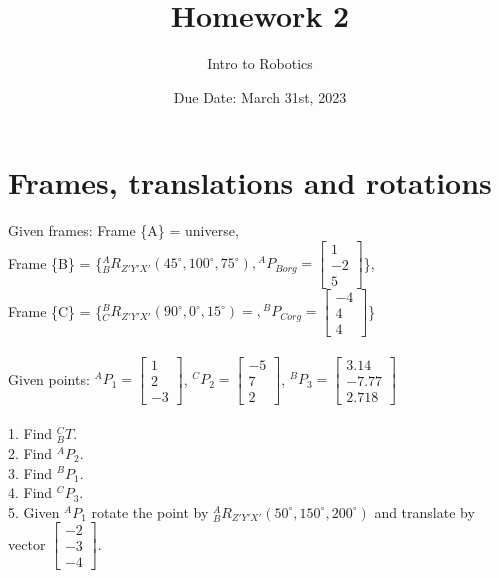 \documentclass{article}
\title{Homework 2}
\author{Intro to Robotics}
\date{Due Date: March 31st, 2023}
\begin{document}
\maketitle
\section{Frames, translations and rotations}
Given frames: Frame \{A\} = universe,\\ 
Frame \{B\} = \{${}^{A}_{B}R_{Z'Y'X'}(45^\circ, 100^\circ, 75^\circ),{}^{A}P_{Borg}=\begin{bmatrix}
1  \\
-2 \\
5
\end{bmatrix} $\},\\
Frame \{C\} = \{${}^{B}_{C}R_{Z'Y'X'}(90^\circ, 0^\circ, 15^\circ)= ,{}^{B}P_{Corg}=\begin{bmatrix}
-4  \\
4 \\
4
\end{bmatrix} $\}\\\\
Given points: ${}^{A}P_{1}=\begin{bmatrix}
1  \\
2 \\
-3
\end{bmatrix}$, ${}^{C}P_{2}=\begin{bmatrix}
-5  \\
7 \\
2
\end{bmatrix}$, ${}^{B}P_{3}=\begin{bmatrix}
3.14  \\
-7.77 \\
2.718
\end{bmatrix}$\\\\
1. Find $^C_BT$.\\
2. Find ${}^{A}P_{2}$.\\
3. Find ${}^{B}P_{1}$.\\
4. Find ${}^{C}P_{3}$. \\
5. Given ${}^{A}P_{1}$ rotate the point by ${}^{A}_{B}R_{Z'Y'X'}(50^\circ, 150^\circ, 200^\circ)$ and translate by vector 
$\begin{bmatrix}
-2  \\
-3  \\
-4
\end{bmatrix}.$
\end{document}

